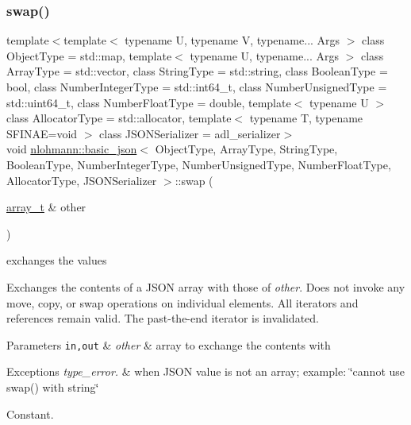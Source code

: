 \subsubsection{\texorpdfstring{swap()}{swap()}\hspace{0.1cm}{\footnotesize\ttfamily [2/4]}}
{\footnotesize\ttfamily template$<$template$<$ typename U, typename V, typename... Args $>$ class Object\+Type = std\+::map, template$<$ typename U, typename... Args $>$ class Array\+Type = std\+::vector, class String\+Type  = std\+::string, class Boolean\+Type  = bool, class Number\+Integer\+Type  = std\+::int64\+\_\+t, class Number\+Unsigned\+Type  = std\+::uint64\+\_\+t, class Number\+Float\+Type  = double, template$<$ typename U $>$ class Allocator\+Type = std\+::allocator, template$<$ typename T, typename S\+F\+I\+N\+A\+E=void $>$ class J\+S\+O\+N\+Serializer = adl\+\_\+serializer$>$ \\
void \mbox{\hyperlink{classnlohmann_1_1basic__json}{nlohmann\+::basic\+\_\+json}}$<$ Object\+Type, Array\+Type, String\+Type, Boolean\+Type, Number\+Integer\+Type, Number\+Unsigned\+Type, Number\+Float\+Type, Allocator\+Type, J\+S\+O\+N\+Serializer $>$\+::swap (\begin{DoxyParamCaption}\item[{\mbox{\hyperlink{classnlohmann_1_1basic__json_ae095578e03df97c5b3991787f1056374}{array\+\_\+t}} \&}]{other }\end{DoxyParamCaption})\hspace{0.3cm}{\ttfamily [inline]}}



exchanges the values 

Exchanges the contents of a J\+S\+ON array with those of {\itshape other}. Does not invoke any move, copy, or swap operations on individual elements. All iterators and references remain valid. The past-\/the-\/end iterator is invalidated.


\begin{DoxyParams}[1]{Parameters}
\mbox{\tt in,out}  & {\em other} & array to exchange the contents with\\
\hline
\end{DoxyParams}

\begin{DoxyExceptions}{Exceptions}
{\em type\+\_\+error.} & when J\+S\+ON value is not an array; example\+: {\ttfamily \char`\"{}cannot
use swap() with string\char`\"{}}\\
\hline
\end{DoxyExceptions}
Constant.


